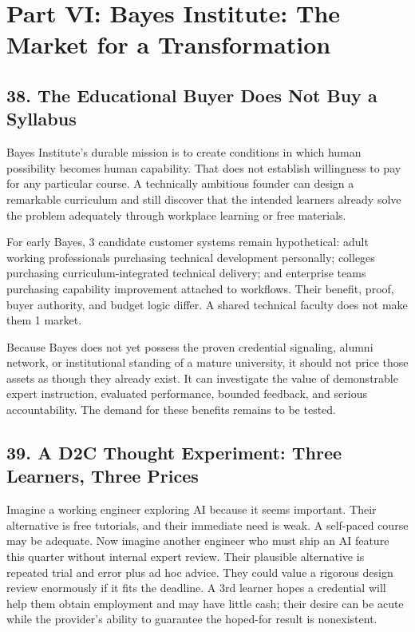 \section*{Part VI: Bayes Institute: The Market for a Transformation}

\subsection*{38. The Educational Buyer Does Not Buy a Syllabus}

Bayes Institute's durable mission is to create conditions in which human possibility becomes human capability. That does not establish willingness to pay for any particular course. A technically ambitious founder can design a remarkable curriculum and still discover that the intended learners already solve the problem adequately through workplace learning or free materials.

For early Bayes, 3 candidate customer systems remain hypothetical: adult working professionals purchasing technical development personally; colleges purchasing curriculum-integrated technical delivery; and enterprise teams purchasing capability improvement attached to workflows. Their benefit, proof, buyer authority, and budget logic differ. A shared technical faculty does not make them 1 market.

Because Bayes does not yet possess the proven credential signaling, alumni network, or institutional standing of a mature university, it should not price those assets as though they already exist. It can investigate the value of demonstrable expert instruction, evaluated performance, bounded feedback, and serious accountability. The demand for these benefits remains to be tested.

\subsection*{39. A D2C Thought Experiment: Three Learners, Three Prices}

Imagine a working engineer exploring AI because it seems important. Their alternative is free tutorials, and their immediate need is weak. A self-paced course may be adequate. Now imagine another engineer who must ship an AI feature this quarter without internal expert review. Their plausible alternative is repeated trial and error plus ad hoc advice. They could value a rigorous design review enormously if it fits the deadline. A 3rd learner hopes a credential will help them obtain employment and may have little cash; their desire can be acute while the provider's ability to guarantee the hoped-for result is nonexistent.


